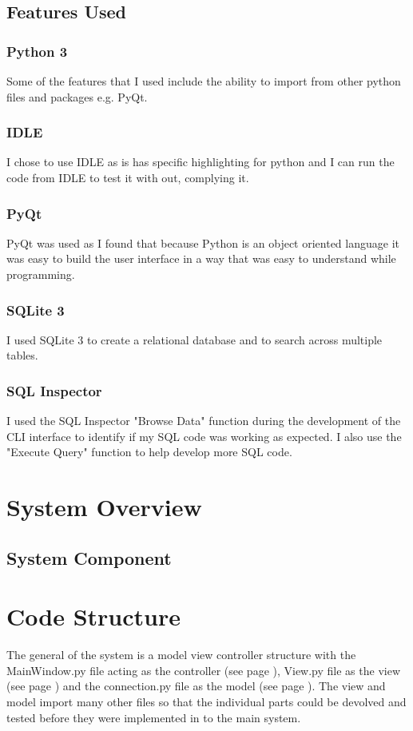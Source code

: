 \subsection{Features Used}
\subsubsection{Python 3}
Some of the features that I used include the ability to import from other python files and packages e.g. PyQt.
\subsubsection{IDLE}
I chose to use IDLE as is has specific highlighting for python and I can run the code from IDLE to test it with out, complying it.
\subsubsection{PyQt}
PyQt was used as I found that because Python is an object oriented language it was easy to build the user interface in a way that was easy to understand while programming.
\subsubsection{SQLite 3}
I used SQLite 3 to create a relational database and to search across multiple tables.
\subsubsection{SQL Inspector}
I used the SQL Inspector "Browse Data" function during the development of the CLI interface to identify if my SQL code was working as expected. I also use the "Execute Query" function to help develop more SQL code.

\section{System Overview}

\subsection{System Component}

\section{Code Structure}
The general of the system is a model view controller structure with the MainWindow.py file acting as the controller (see page \pageref{fig:MW.py}), View.py file as the view (see page \pageref{fig:Con.py}) and the connection.py file as the model (see page \pageref{fig:View.py}). The view and model import many other files so that the individual parts could be devolved and tested before they were implemented in to the main system.

